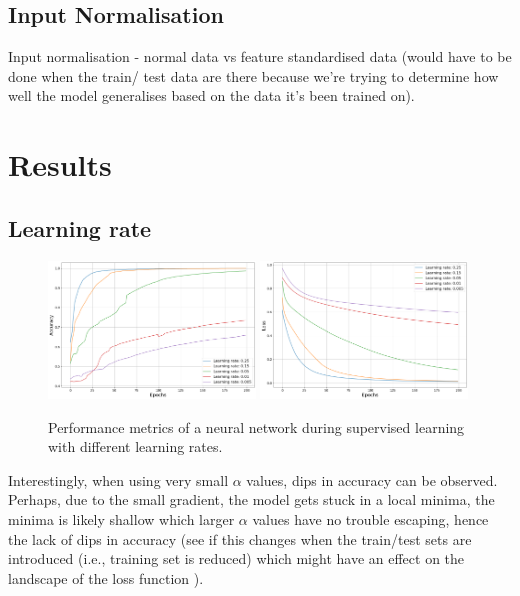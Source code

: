 \documentclass{article}
\begin{document}
\subsection{Input Normalisation}
Input normalisation - normal data vs feature standardised data (would have to be done when the train/ test data are there because we're trying to determine how well the model generalises based on the data it's been trained on).


\section{Results}
\subsection{Learning rate}

\begin{figure}[H]
\centering
\includegraphics[width=0.49\textwidth]{figs/alphas_acc.png}
\includegraphics[width=0.49\textwidth]{figs/alphas_loss.png}
\caption{Performance metrics of a neural network during supervised learning with different learning rates.}
\label{fig:perf_alpha}
\end{figure}

Interestingly, when using very small $\alpha$ values, dips in accuracy can be observed. Perhaps, due to the small gradient, the model gets stuck in a local minima, the minima is likely shallow which larger $\alpha$ values have no trouble escaping, hence the lack of dips in accuracy (see if this changes when the train/test sets are introduced (i.e., training set is reduced) which might have an effect on the landscape of the loss function \cite{Guo}).
\end{document}
